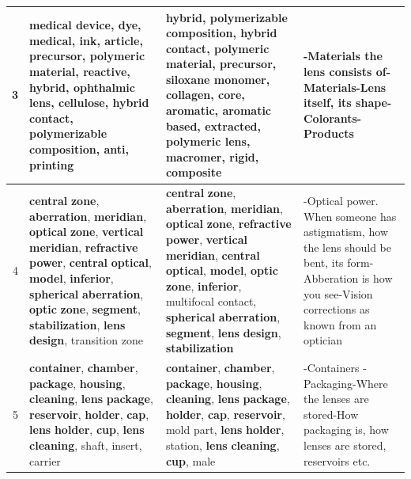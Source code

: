 \begin{longtable}[htbp]{|r|p{11.3em}|p{11.3em}|p{10em}|}
    \midrule
    3 & medical device, dye, medical, ink, article, \textbf{precursor}, \textbf{polymeric} \textbf{material}, reactive, \textbf{hybrid}, ophthalmic lens, cellulose, \textbf{hybrid} \textbf{contact}, \textbf{polymerizable} \textbf{composition}, anti, printing & \textbf{hybrid}, \textbf{polymerizable} \textbf{composition}, \textbf{hybrid} \textbf{contact}, \textbf{polymeric} \textbf{material}, \textbf{precursor}, siloxane monomer, collagen, core, aromatic, aromatic based, extracted, polymeric lens, macromer, rigid, composite &-Materials the lens consists of\newline{}-Materials\newline{}-Lens itself, its shape\newline{}-Colorants\newline{}-Products \\
    \midrule
    4 & \textbf{central} \textbf{zone}, \textbf{aberration}, \textbf{meridian}, \textbf{optical} \textbf{zone}, \textbf{vertical} \textbf{meridian}, \textbf{refractive} \textbf{power}, \textbf{central} \textbf{optical}, \textbf{model}, \textbf{inferior}, \textbf{spherical} \textbf{aberration}, \textbf{optic} \textbf{zone}, \textbf{segment}, \textbf{stabilization}, \textbf{lens} \textbf{design}, transition zone & \textbf{central} \textbf{zone}, \textbf{aberration}, \textbf{meridian}, \textbf{optical} \textbf{zone}, \textbf{refractive} \textbf{power}, \textbf{vertical} \textbf{meridian}, \textbf{central} \textbf{optical}, \textbf{model}, \textbf{optic} \textbf{zone}, \textbf{inferior}, multifocal contact, \textbf{spherical} \textbf{aberration}, \textbf{segment}, \textbf{lens} \textbf{design}, \textbf{stabilization} & -Optical power. When someone has astigmatism, how the lens should be bent, its form\newline{}-Abberation is how you see\newline{}-Vision corrections as known from an optician \\
    \midrule
    5 & \textbf{container}, \textbf{chamber}, \textbf{package}, \textbf{housing}, \textbf{cleaning}, \textbf{lens} \textbf{package}, \textbf{reservoir}, \textbf{holder}, \textbf{cap}, \textbf{lens} \textbf{holder}, \textbf{cup}, \textbf{lens} \textbf{cleaning}, shaft, insert, carrier & \textbf{container}, \textbf{chamber}, \textbf{package}, \textbf{housing}, \textbf{cleaning}, \textbf{lens} \textbf{package}, \textbf{holder}, \textbf{cap}, \textbf{reservoir}, mold part, \textbf{lens} \textbf{holder}, station, \textbf{lens} \textbf{cleaning}, \textbf{cup}, male & -Containers \newline{}-Packaging\newline{}-Where the lenses are stored\newline{}-How packaging is, how lenses are stored, reservoirs etc. \\

\end{longtable}
